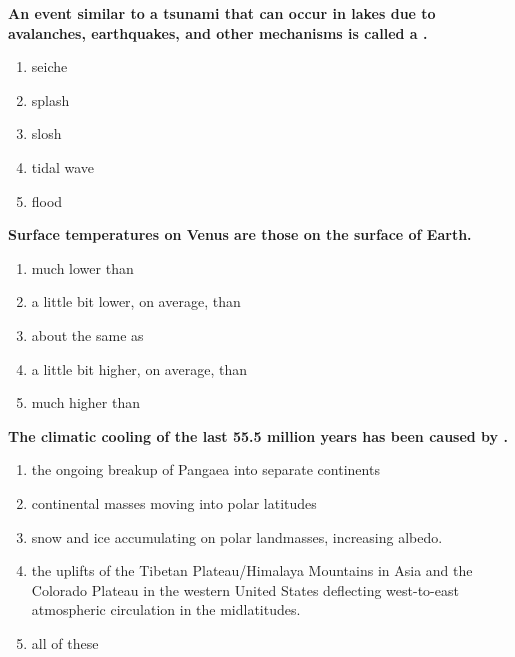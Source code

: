 \item {
\setlength{\itemsep}{0cm}
\setlength{\parskip}{.2cm}
\begin{samepage}
\textbf{
An event similar to a tsunami that can occur in lakes due to avalanches, earthquakes, and other mechanisms is called a \makebox[1cm]{\Rivpt\hrulefill\Rivpt}.
}
\begin{enumerate}
\item { 	seiche }
\item { 	splash }
\item { 	slosh }
\item { 	tidal wave }
\item { 	flood }
\end{enumerate}
\end{samepage}
}
\item {
\setlength{\itemsep}{0cm}
\setlength{\parskip}{.2cm}
\begin{samepage}
\textbf{
Surface temperatures on Venus are \makebox[1cm]{\Rivpt\hrulefill\Rivpt} those on the surface of Earth.
}
\begin{enumerate}
\item {  much lower than }
\item {  a little bit lower, on average, than }
\item {  about the same as }
\item {  a little bit higher, on average, than }
\item {  much higher than }
\end{enumerate}
\end{samepage}
}
\item {
\setlength{\itemsep}{0cm}
\setlength{\parskip}{.2cm}
\begin{samepage}
\textbf{
The climatic cooling of the last 55.5 million years has been caused by \makebox[1cm]{\Rivpt\hrulefill\Rivpt}.
}
\begin{enumerate}
\item {  the ongoing breakup of Pangaea into separate continents   }
\item {  continental masses moving into polar latitudes }
\item {  snow and ice accumulating on polar landmasses, increasing albedo.  }
\item {  the uplifts of the Tibetan Plateau/Himalaya Mountains in Asia and the Colorado Plateau in the western United States deflecting west-to-east atmospheric circulation in the midlatitudes. }
\item {  all of these }
\end{enumerate}
\end{samepage}
}
